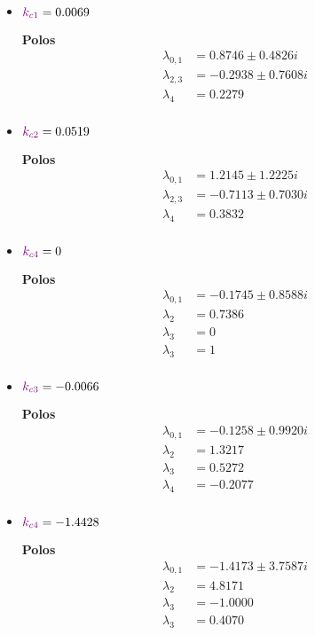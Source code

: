 \begin{multicols}{2}
  \begin{itemize}
      \item \(\mathbin{\color{violet}k_{c1}} = 0.0069  \) 

        \textbf{Polos}
        \begin{align}
        \lambda_{0,1} &= 0.8746 \pm 0.4826i\\
        \lambda_{2,3} &= -0.2938 \pm 0.7608i \\
        \lambda_{4} &= 0.2279 \\
        \end{align}

      \item \(\mathbin{\color{violet}k_{c2}} = 0.0519\)

      \textbf{Polos}
      \begin{align}
        \lambda_{0,1} &= 1.2145 \pm 1.2225i \\
        \lambda_{2,3} &= -0.7113 \pm 0.7030i\\
        \lambda_{4} &= 0.3832 \\
        \end{align}

    \item \(\mathbin{\color{violet}k_{c4}} = 0\)

    \textbf{Polos}
    \begin{align}
      \lambda_{0,1} &= -0.1745 \pm 0.8588i \\
      \lambda_{2} &= 0.7386  \\
      \lambda_{3} &= 0  \\
      \lambda_{3} &= 1  \\
    \end{align}
        
  \end{itemize}
  \columnbreak
  \begin{itemize}
      \item \(\mathbin{\color{violet}k_{c3}} = -0.0066\)

      \textbf{Polos}
      \begin{align}
        \lambda_{0,1} &= -0.1258 \pm 0.9920i \\
        \lambda_{2} &= 1.3217\\
        \lambda_{3} &= 0.5272  \\
        \lambda_{4} &= -0.2077\\
        \end{align}

      \item \(\mathbin{\color{violet}k_{c4}} = -1.4428\)

      \textbf{Polos}
      \begin{align}
        \lambda_{0,1} &= -1.4173 \pm 3.7587i \\
        \lambda_{2} &= 4.8171 \\
        \lambda_{3} &= -1.0000  \\
        \lambda_{3} &= 0.4070   \\
        \end{align}       
  \end{itemize}
\end{multicols}

